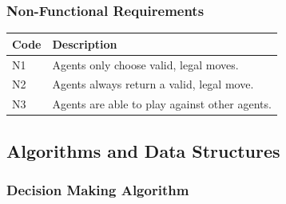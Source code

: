 \documentclass[12pt,a4paper]{article}
\begin{document}
    \subsubsection*{Non-Functional Requirements}
      
    \begin{center}
        \begin{tabular*}{1\textwidth}{| l | p{144.5mm} |}
        \hline
        Code & Description \\ \hline
        N1 & Agents only choose valid, legal moves. \\ \hline
        N2 & Agents always return a valid, legal move.\\ \hline
        N3 & Agents are able to play against other agents. \\ \hline
        \end{tabular*}
    \end{center}



\subsection*{Algorithms and Data Structures}

\subsubsection{Decision Making Algorithm}
\end{document}
